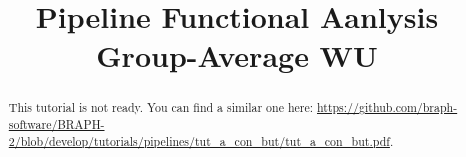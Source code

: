 \documentclass[justified]{tufte-handout}
\title{Pipeline Functional Aanlysis Group-Average WU}
\begin{document}
\maketitle

\begin{abstract}
\noindent
This tutorial is not ready. You can find a similar one here: \url{https://github.com/braph-software/BRAPH-2/blob/develop/tutorials/pipelines/tut_a_con_but/tut_a_con_but.pdf}.
\end{abstract}
\end{document}
